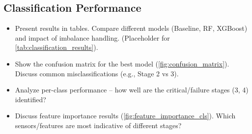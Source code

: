 \subsection{Classification Performance}
\begin{itemize}
	\item Present results in tables. Compare different models (Baseline, RF, XGBoost) and impact of imbalance handling. (Placeholder for \cref{tab:classification_results}).
	\item Show the confusion matrix for the best model (\cref{fig:confusion_matrix}). Discuss common misclassifications (e.g., Stage 2 vs 3).
	\item Analyze per-class performance – how well are the critical/failure stages (3, 4) identified?
	\item Discuss feature importance results (\cref{fig:feature_importance_cls}). Which sensors/features are most indicative of different stages?
\end{itemize}


